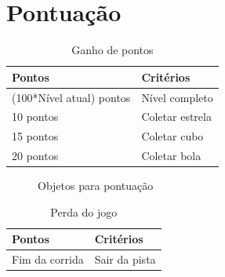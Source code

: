 \part{Pontuação}

\begin{table}[h]
		\centering
		\caption{Ganho de pontos}
	\begin{center}
	\begin{tabular}{|l|l|}
		\hline
			Pontos & Critérios \\ %
	
		\hline                               %
			(100*Nível atual) pontos & Nível completo \\
		\hline	10 pontos & Coletar estrela \\
		\hline	15 pontos & Coletar cubo \\
		\hline	20 pontos & Coletar bola \\
		\hline
 
	\end{tabular}
	\end{center}
\end{table}

\begin{figure}[!h]
	\centering
	\quad
	\quad
	\caption{Objetos para pontuação}
\end{figure}

\begin{table}[h]
		\centering
		\caption{Perda do jogo}
	\begin{center}
	\begin{tabular}{|l|l|}
		\hline
			Pontos & Critérios \\ %
	
		\hline Fim da corrida & Sair da pista \\
		\hline
 
	\end{tabular}
	\end{center}
\end{table}